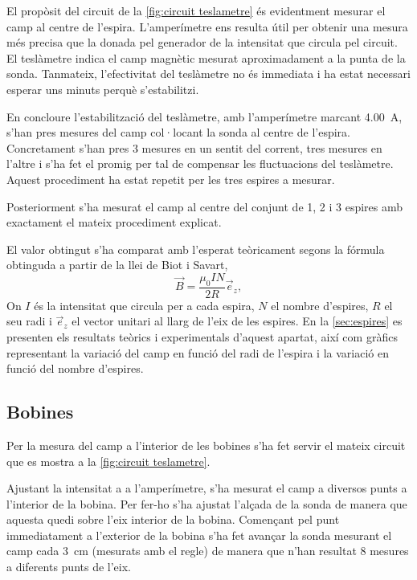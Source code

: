 El propòsit del circuit de la \cref{fig:circuit teslametre} és evidentment mesurar el camp al centre de l'espira. L'amperímetre ens resulta útil per obtenir una mesura més precisa que la donada pel generador de la intensitat que circula pel circuit. El teslàmetre indica el camp magnètic mesurat aproximadament a la punta de la sonda. Tanmateix, l'efectivitat del teslàmetre no és immediata i ha estat necessari esperar uns minuts perquè s'estabilitzi.

En concloure l'estabilització del teslàmetre, amb l'amperímetre marcant \SI{4.00}{A}, s'han pres mesures del camp col·locant la sonda al centre de l'espira. Concretament s'han pres 3 mesures en un sentit del corrent, tres mesures en l'altre i s'ha fet el promig per tal de compensar les fluctuacions del teslàmetre. Aquest procediment ha estat repetit per les tres espires a mesurar.

Posteriorment s'ha mesurat el camp al centre del conjunt de 1, 2 i 3 espires amb exactament el mateix procediment explicat.

El valor obtingut s'ha comparat amb l'esperat teòricament segons la fórmula obtinguda a partir de la llei de Biot i Savart,
\begin{equation}\label{eq:camp espira}
  \vec{B}=\frac{\mu_0 I N}{2 R}\vec{e}_z,
\end{equation}
On \( I \) és la intensitat que circula per a cada espira, \( N \) el nombre d'espires, \( R \) el seu radi i \( \vec{e}_z \) el vector unitari al llarg de l'eix de les espires. En la \cref{sec:espires} es presenten els resultats teòrics i experimentals d'aquest apartat, així com gràfics representant la variació del camp en funció del radi de l'espira i la variació en funció del nombre d'espires.

\subsection{Bobines}
Per la mesura del camp a l'interior de les bobines s'ha fet servir el mateix circuit que es mostra a la \cref{fig:circuit teslametre}.

Ajustant la intensitat a  a l'amperímetre, s'ha mesurat el camp a diversos punts a l'interior de la bobina. Per fer-ho s'ha ajustat l'alçada de la sonda de manera que aquesta quedi sobre l'eix interior de la bobina. Començant pel punt immediatament a l'exterior de la bobina s'ha fet avançar la sonda mesurant el camp cada \SI{3}{cm} (mesurats amb el regle) de manera que n'han resultat 8 mesures a diferents punts de l'eix.

